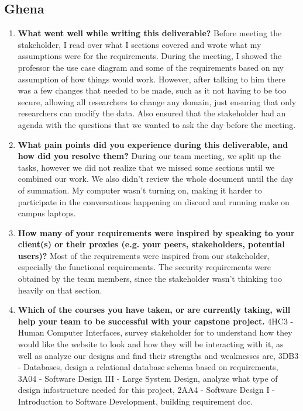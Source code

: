 \subsection*{Ghena}

\begin{enumerate}
  \item \textbf{What went well while writing this deliverable?} 
  Before meeting the stakeholder, I read over what I sections covered and wrote what my assumptions were for the requirements. During the meeting, I showed the professor the use case diagram and some of the requirements based on my assumption of how things would work. However, after talking to him there was a few changes that needed to be made, such as it not having to be too secure, allowing all researchers to change any domain, just ensuring that only researchers can modify the data. Also ensured that the stakeholder had an agenda with the questions that we wanted to ask the day before the meeting. 
  \item \textbf{What pain points did you experience during this deliverable, and how did
  you resolve them?}
  During our team meeting, we split up the tasks, however we did not realize that we missed some sections until we combined our work. We also didn't review the whole document until the day of summation. My computer wasn't turning on, making it harder to participate in the conversations happening on discord and running make on campus laptops.
  \item \textbf{How many of your requirements were inspired by speaking to your
  client(s) or their proxies (e.g. your peers, stakeholders, potential users)?}
  Most of the requirements were inspired from our stakeholder, especially the functional requirements. The security requirements were obtained by the team members, since the stakeholder wasn't thinking too heavily on that section. 
  \item \textbf{Which of the courses you have taken, or are currently taking, will help
  your team to be successful with your capstone project.}
  4HC3 - Human Computer Interfaces, survey stakeholder for to understand how they would like the website to look and how they will be interacting with it, as well as analyze our designs and find their strengths and weaknesses are, 3DB3 - Databases, design a relational database schema based on requirements, 3A04 - Software Design III - Large System Design, analyze what type of design infostructure needed for this project, 2AA4 - Software Design I - Introduction to Software Development, building requirement doc. 

\end{enumerate}
